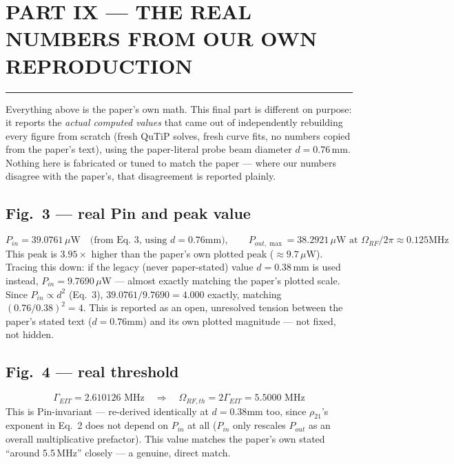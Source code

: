 \documentclass[11pt]{article}
\begin{document}
\section*{\Huge PART IX --- THE REAL NUMBERS FROM OUR OWN REPRODUCTION}
\noindent\rule{\linewidth}{1.6pt}\par\vspace{6pt}
Everything above is the paper's own math. This final part is different on purpose: it reports the \emph{actual computed values} that came out of independently rebuilding every figure from scratch (fresh QuTiP solves, fresh curve fits, no numbers copied from the paper's text), using the paper-literal probe beam diameter $d=0.76$\,mm. Nothing here is fabricated or tuned to match the paper --- where our numbers disagree with the paper's, that disagreement is reported plainly.

\subsection*{Fig.~3 --- real Pin and peak value}
\[
P_{in} = 39.0761\,\mu\text{W} \quad\text{(from Eq.~3, using }d=0.76\text{mm)}, \qquad
P_{out,\max} = 38.2921\,\mu\text{W at }\Omega_{RF}/2\pi\approx0.125\text{MHz}
\]
This peak is $3.95\times$ higher than the paper's own plotted peak ($\approx9.7\,\mu$W). Tracing this down: if the legacy (never paper-stated) value $d=0.38$\,mm is used instead, $P_{in}=9.7690\,\mu$W --- almost exactly matching the paper's plotted scale. Since $P_{in}\propto d^2$ (Eq.~3), $39.0761/9.7690=4.000$ exactly, matching $(0.76/0.38)^2=4$. This is reported as an open, unresolved tension between the paper's stated text ($d=0.76$mm) and its own plotted magnitude --- not fixed, not hidden.

\subsection*{Fig.~4 --- real threshold}
\[
\Gamma_{EIT} = 2.610126\text{ MHz} \quad\Rightarrow\quad \boxed{\Omega_{RF,th}=2\Gamma_{EIT}=5.5000\text{ MHz}}
\]
This is Pin-invariant --- re-derived identically at $d=0.38$mm too, since $\rho_{21}$'s exponent in Eq.~2 does not depend on $P_{in}$ at all ($P_{in}$ only rescales $P_{out}$ as an overall multiplicative prefactor). This value matches the paper's own stated ``around 5.5\,MHz'' closely --- a genuine, direct match.
\end{document}
